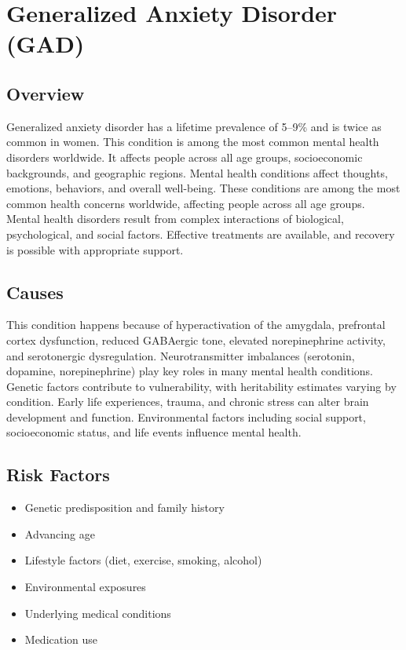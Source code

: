 \chapter{Generalized Anxiety Disorder (GAD)}
\label{sec:Generalized Anxiety Disorder (GAD)}

\section{Overview}
Generalized anxiety disorder has a lifetime prevalence of 5--9\% and is twice as common in women. This condition is among the most common mental health disorders worldwide. It affects people across all age groups, socioeconomic backgrounds, and geographic regions. Mental health conditions affect thoughts, emotions, behaviors, and overall well-being. These conditions are among the most common health concerns worldwide, affecting people across all age groups. Mental health disorders result from complex interactions of biological, psychological, and social factors. Effective treatments are available, and recovery is possible with appropriate support.
\section{Causes}
This condition happens because of hyperactivation of the amygdala, prefrontal cortex dysfunction, reduced GABAergic tone, elevated norepinephrine activity, and serotonergic dysregulation.  Neurotransmitter imbalances (serotonin, dopamine, norepinephrine) play key roles in many mental health conditions. Genetic factors contribute to vulnerability, with heritability estimates varying by condition. Early life experiences, trauma, and chronic stress can alter brain development and function. Environmental factors including social support, socioeconomic status, and life events influence mental health.   
\section{Risk Factors}
\begin{itemize}[noitemsep]
  \item Genetic predisposition and family history
  \item Advancing age
  \item Lifestyle factors (diet, exercise, smoking, alcohol)
  \item Environmental exposures
  \item Underlying medical conditions
  \item Medication use
\end{itemize}
